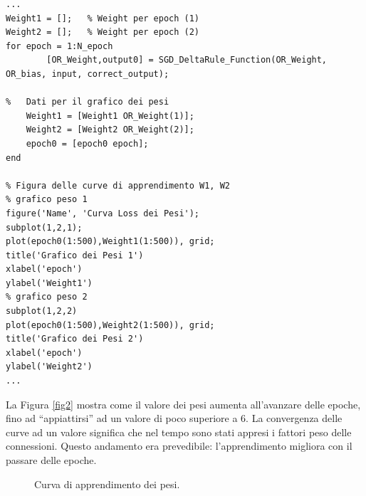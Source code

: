 \documentclass[a4paper,11pt]{article}
\begin{document}
\begin{lstlisting}[style=Matlab-editor,title=\texttt{Perc\_Training.mat}]
...
Weight1 = [];   % Weight per epoch (1)
Weight2 = [];   % Weight per epoch (2)
for epoch = 1:N_epoch
        [OR_Weight,output0] = SGD_DeltaRule_Function(OR_Weight, OR_bias, input, correct_output);

%   Dati per il grafico dei pesi
    Weight1 = [Weight1 OR_Weight(1)];
    Weight2 = [Weight2 OR_Weight(2)];
    epoch0 = [epoch0 epoch];
end

% Figura delle curve di apprendimento W1, W2
% grafico peso 1
figure('Name', 'Curva Loss dei Pesi');
subplot(1,2,1);
plot(epoch0(1:500),Weight1(1:500)), grid;
title('Grafico dei Pesi 1')
xlabel('epoch')
ylabel('Weight1')
% grafico peso 2
subplot(1,2,2)
plot(epoch0(1:500),Weight2(1:500)), grid;
title('Grafico dei Pesi 2')
xlabel('epoch')
ylabel('Weight2')
...
\end{lstlisting}

La Figura \vref{fig2} mostra come il valore dei pesi aumenta all'avanzare delle epoche, fino ad ``appiattirsi'' ad un valore di poco superiore a 6. La convergenza delle curve ad un valore significa che nel tempo sono stati appresi i fattori peso delle connessioni. Questo andamento era prevedibile: l'apprendimento migliora con il passare delle epoche.

\begin{figure}[htb]
    \centering
    \caption{Curva di apprendimento dei pesi.}
    \label{fig2}
\end{figure}
\end{document}
